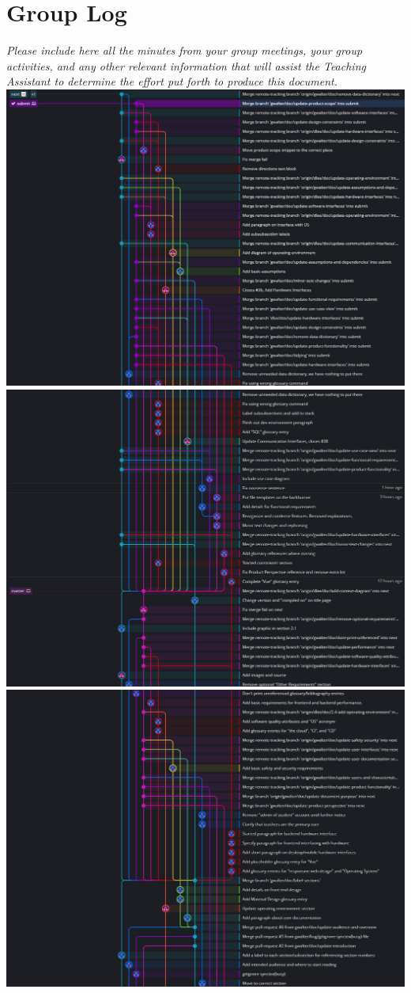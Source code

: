 
\section{Group Log}\label{sec:group-log}
    \emph{Please include here all the minutes from your group meetings, your group activities, and any other relevant information that will assist the Teaching Assistant to determine the effort put forth to produce this document.}
    \includegraphics[width=\textwidth]{images/1.png}
    \includegraphics[width=\textwidth]{images/2.png}
    \includegraphics[width=\textwidth]{images/3.png}
